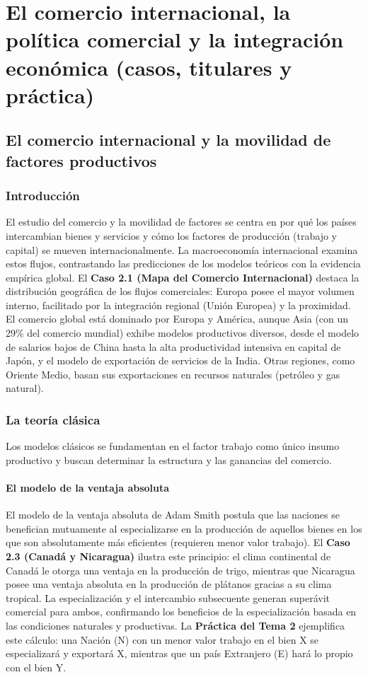 \chapter{El comercio internacional, la política comercial y la integración económica (casos, titulares y práctica)}

\section{El comercio internacional y la movilidad de factores productivos}

\subsection{Introducción}

El estudio del comercio y la movilidad de factores se centra en por qué los países intercambian bienes y servicios y cómo los factores de producción (trabajo y capital) se mueven internacionalmente. La macroeconomía internacional examina estos flujos, contrastando las predicciones de los modelos teóricos con la evidencia empírica global. El \textbf{Caso 2.1 (Mapa del Comercio Internacional)} destaca la distribución geográfica de los flujos comerciales: Europa posee el mayor volumen interno, facilitado por la integración regional (Unión Europea) y la proximidad. El comercio global está dominado por Europa y América, aunque Asia (con un 29\% del comercio mundial) exhibe modelos productivos diversos, desde el modelo de salarios bajos de China hasta la alta productividad intensiva en capital de Japón, y el modelo de exportación de servicios de la India. Otras regiones, como Oriente Medio, basan sus exportaciones en recursos naturales (petróleo y gas natural).

\subsection{La teoría clásica}
Los modelos clásicos se fundamentan en el factor trabajo como único insumo productivo y buscan determinar la estructura y las ganancias del comercio.

\subsubsection{El modelo de la ventaja absoluta}
El modelo de la ventaja absoluta de Adam Smith postula que las naciones se benefician mutuamente al especializarse en la producción de aquellos bienes en los que son absolutamente más eficientes (requieren menor valor trabajo). El \textbf{Caso 2.3 (Canadá y Nicaragua)} ilustra este principio: el clima continental de Canadá le otorga una ventaja en la producción de trigo, mientras que Nicaragua posee una ventaja absoluta en la producción de plátanos gracias a su clima tropical. La especialización y el intercambio subsecuente generan superávit comercial para ambos, confirmando los beneficios de la especialización basada en las condiciones naturales y productivas. La \textbf{Práctica del Tema 2} ejemplifica este cálculo: una Nación (N) con un menor valor trabajo en el bien X se especializará y exportará X, mientras que un país Extranjero (E) hará lo propio con el bien Y.

